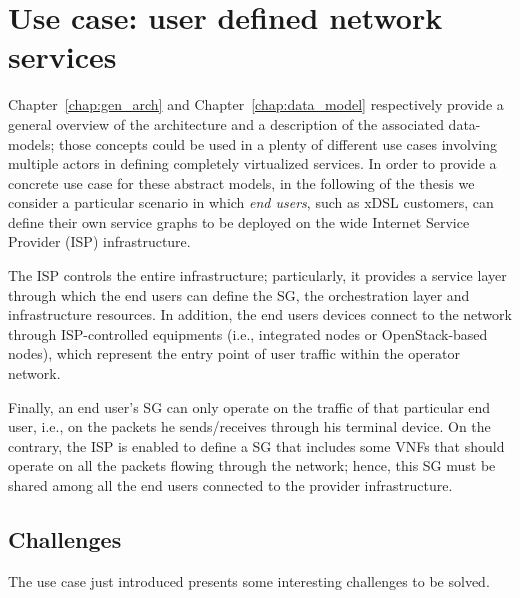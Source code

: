 \chapter{Use case: user defined network services}
\label{sec:use_case}

Chapter~\ref{chap:gen_arch} and Chapter~\ref{chap:data_model} respectively provide a general overview of the architecture and a description of the associated data-models; those concepts could be used in a plenty of different use cases involving multiple actors in defining completely virtualized services. 
In order to provide a concrete use case for these abstract models, in the following of the thesis we consider a particular scenario in which \textit{end users}, such as xDSL customers, can define their own service graphs to be deployed on the wide Internet Service Provider (ISP) infrastructure. 

The ISP controls the entire infrastructure; particularly, it provides a service layer through which the end users can define the SG, the orchestration layer and infrastructure resources.
In addition, the end users devices connect to the network through ISP-controlled equipments (i.e., integrated nodes or OpenStack-based nodes), which represent the entry point of user traffic within the operator network.

Finally, an end user's SG can only operate on the traffic of that particular end user, i.e., on the packets he sends/receives through his terminal device.
On the contrary, the ISP is enabled to define a SG that includes some VNFs that should operate on all the packets flowing through the network; hence, this SG must be shared among all the end users connected to the provider infrastructure.


\section{Challenges}

The use case just introduced presents some interesting challenges to be solved. 




